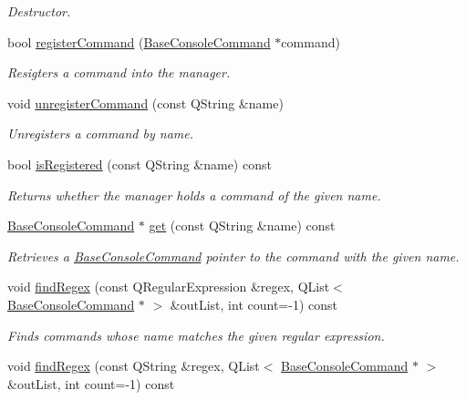 \begin{DoxyCompactItemize}
\begin{DoxyCompactList}\small\item\em Destructor. \end{DoxyCompactList}\item 
bool \hyperlink{class_command_manager_a5fbd5a0e340f8aa29e228ad429743f8b}{register\-Command} (\hyperlink{class_base_console_command}{Base\-Console\-Command} $\ast$command)
\begin{DoxyCompactList}\small\item\em Resigters a command into the manager. \end{DoxyCompactList}\item 
void \hyperlink{class_command_manager_ae381ba2ee8706a1def77b356e7a4f7a7}{unregister\-Command} (const Q\-String \&name)
\begin{DoxyCompactList}\small\item\em Unregisters a command by name. \end{DoxyCompactList}\item 
bool \hyperlink{class_command_manager_af105989a8f6a7360295e7d2b7cd61d6e}{is\-Registered} (const Q\-String \&name) const 
\begin{DoxyCompactList}\small\item\em Returns whether the manager holds a command of the given name. \end{DoxyCompactList}\item 
\hyperlink{class_base_console_command}{Base\-Console\-Command} $\ast$ \hyperlink{class_command_manager_ae2c6db5f2f968ac86e34938316cabedc}{get} (const Q\-String \&name) const 
\begin{DoxyCompactList}\small\item\em Retrieves a \hyperlink{class_base_console_command}{Base\-Console\-Command} pointer to the command with the given name. \end{DoxyCompactList}\item 
void \hyperlink{class_command_manager_a51c40a9016fc20bf4aba957982f00164}{find\-Regex} (const Q\-Regular\-Expression \&regex, Q\-List$<$ \hyperlink{class_base_console_command}{Base\-Console\-Command} $\ast$ $>$ \&out\-List, int count=-\/1) const 
\begin{DoxyCompactList}\small\item\em Finds commands whose name matches the given regular expression. \end{DoxyCompactList}\item 
void \hyperlink{class_command_manager_a2b0759f29a6059aed61dd2d2f0b615ab}{find\-Regex} (const Q\-String \&regex, Q\-List$<$ \hyperlink{class_base_console_command}{Base\-Console\-Command} $\ast$ $>$ \&out\-List, int count=-\/1) const 

\end{DoxyCompactItemize}

